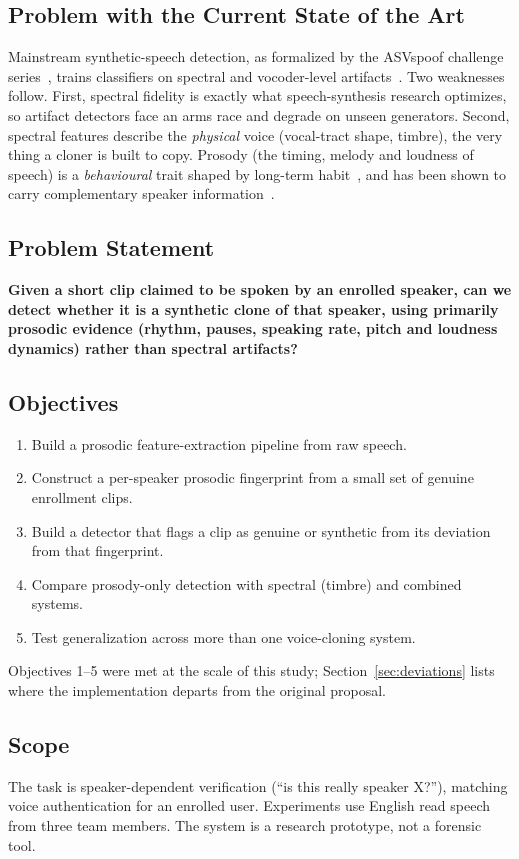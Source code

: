 \documentclass[11pt,a4paper]{article}
\begin{document}
\subsection{Problem with the Current State of the Art}
Mainstream synthetic-speech detection, as formalized by the ASVspoof challenge series~\cite{asvspoof}, trains classifiers on spectral and vocoder-level artifacts~\cite{wavefake}. Two weaknesses follow. First, spectral fidelity is exactly what speech-synthesis research optimizes, so artifact detectors face an arms race and degrade on unseen generators. Second, spectral features describe the \emph{physical} voice (vocal-tract shape, timbre), the very thing a cloner is built to copy. Prosody (the timing, melody and loudness of speech) is a \emph{behavioural} trait shaped by long-term habit~\cite{survey}, and has been shown to carry complementary speaker information~\cite{dehak,prosodyid}.

\subsection{Problem Statement}
\textbf{Given a short clip claimed to be spoken by an enrolled speaker, can we detect whether it is a synthetic clone of that speaker, using primarily prosodic evidence (rhythm, pauses, speaking rate, pitch and loudness dynamics) rather than spectral artifacts?}

\subsection{Objectives}
\begin{enumerate}
\item Build a prosodic feature-extraction pipeline from raw speech.
\item Construct a per-speaker prosodic fingerprint from a small set of genuine enrollment clips.
\item Build a detector that flags a clip as genuine or synthetic from its deviation from that fingerprint.
\item Compare prosody-only detection with spectral (timbre) and combined systems.
\item Test generalization across more than one voice-cloning system.
\end{enumerate}
Objectives 1--5 were met at the scale of this study; Section~\ref{sec:deviations} lists where the implementation departs from the original proposal.

\subsection{Scope}
The task is speaker-dependent verification (``is this really speaker X?''), matching voice authentication for an enrolled user. Experiments use English read speech from three team members. The system is a research prototype, not a forensic tool.
\end{document}
